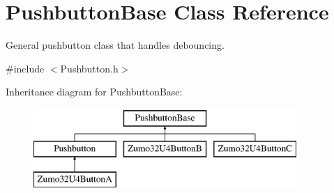 \hypertarget{class_pushbutton_base}{}\section{Pushbutton\+Base Class Reference}
\label{class_pushbutton_base}


General pushbutton class that handles debouncing.  




{\ttfamily \#include $<$Pushbutton.\+h$>$}

Inheritance diagram for Pushbutton\+Base\+:\begin{figure}[H]
\begin{center}
\leavevmode
\includegraphics[height=3.000000cm]{class_pushbutton_base}
\end{center}
\end{figure}
